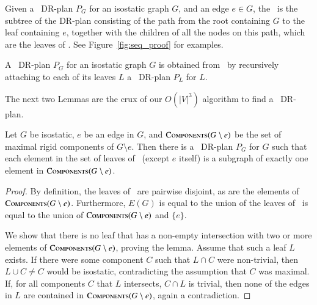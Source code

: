 \begin{definition}
[\Branch]
    Given a \pseudosequential\ DR-plan $P_G$ for an isostatic graph $G$, and an edge $e \in G$, the \branchGePG\ is the subtree of the DR-plan consisting of the path from the root containing $G$ to the leaf containing $e$, together with the children of all the nodes on this path, which are the leaves of \branchGePG. See Figure~\ref{fig:seq_proof} for examples.
\end{definition}

\begin{observation}
\label{obs:seqplan_rec_from_branches}
    A \pseudosequential\ DR-plan $P_G$ for an isostatic graph $G$ is obtained from \branchGePG\ by recursively attaching to each of its leaves $L$ a \pseudosequential\ DR-plan $P_L$ for $L$.
\end{observation}

The next two Lemmas are the crux of our $O(|V|^3)$ algorithm to find a \pseudosequential\ DR-plan.

\begin{lemma}
\label{lem:leaves-from-comps}
    Let $G$ be isostatic, $e$ be an edge in $G$, and $\textsc{Components}(G\setminus e)$ be the set of maximal rigid components of $G\setminus e$. Then there is a \pseudosequential\ DR-plan $P_G$ for $G$ such that each element in the set of leaves of \branchGePG\ (except $e$ itself) is a subgraph of exactly one element in $\textsc{Components}(G\setminus e)$.
\end{lemma}

\begin{proof}
    By definition, the leaves of \branchGePG\ are pairwise disjoint, as are the elements of $\textsc{Components}(G\setminus e)$. Furthermore, $E(G)$ is equal to the union of the leaves of \branchGePG\ is equal to the union of $\textsc{Components}(G\setminus e)$ and $\{ e \}$.

    We show that there is no leaf that has a non-empty intersection with two or more elements of $\textsc{Components}(G\setminus e)$, proving the lemma. Assume that such a leaf $L$ exists. If there were some component $C$ such that $L\cap C$ were non-trivial, then $L\cup C\neq C$ would be isostatic, contradicting the assumption that $C$ was maximal. If, for all components $C$ that $L$ intersects, $C\cap L$ is trivial, then none of the edges in $L$ are contained in $\textsc{Components}(G\setminus e)$, again a contradiction.
\end{proof}

